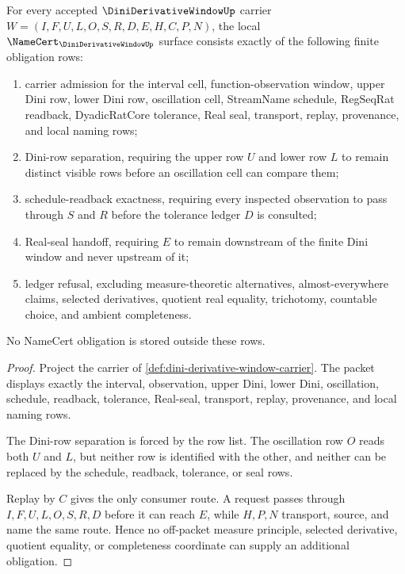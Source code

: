 \begin{theorem}
\label{thm:dini-derivative-window-namecert-obligations}
For every accepted $\DiniDerivativeWindowUp$ carrier $W=(I,F,U,L,O,S,R,D,E,H,C,P,N)$, the local $\NameCert_{\DiniDerivativeWindowUp}$ surface consists exactly of the following finite obligation rows:
\begin{enumerate}
\item carrier admission for the interval cell, function-observation window, upper Dini row, lower Dini row, oscillation cell, StreamName schedule, RegSeqRat readback, DyadicRatCore tolerance, Real seal, transport, replay, provenance, and local naming rows;
\item Dini-row separation, requiring the upper row $U$ and lower row $L$ to remain distinct visible rows before an oscillation cell can compare them;
\item schedule-readback exactness, requiring every inspected observation to pass through $S$ and $R$ before the tolerance ledger $D$ is consulted;
\item Real-seal handoff, requiring $E$ to remain downstream of the finite Dini window and never upstream of it;
\item ledger refusal, excluding measure-theoretic alternatives, almost-everywhere claims, selected derivatives, quotient real equality, trichotomy, countable choice, and ambient completeness.
\end{enumerate}
No NameCert obligation is stored outside these rows.
\end{theorem}
\begin{proof}
Project the carrier of \autoref{def:dini-derivative-window-carrier}. The packet displays exactly the interval, observation, upper Dini, lower Dini, oscillation, schedule, readback, tolerance, Real-seal, transport, replay, provenance, and local naming rows.

The Dini-row separation is forced by the row list. The oscillation row $O$ reads both $U$ and $L$, but neither row is identified with the other, and neither can be replaced by the schedule, readback, tolerance, or seal rows.

Replay by $C$ gives the only consumer route. A request passes through $I,F,U,L,O,S,R,D$ before it can reach $E$, while $H,P,N$ transport, source, and name the same route. Hence no off-packet measure principle, selected derivative, quotient equality, or completeness coordinate can supply an additional obligation.
\end{proof}

